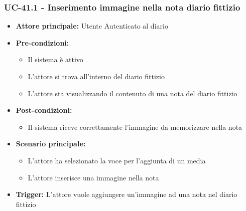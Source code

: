 \documentclass[a4paper,12pt]{article}
\begin{document}
\subsubsection{UC-41.1 - Inserimento immagine nella nota diario fittizio} \label{subsec:UC-41.1}
\begin{itemize}
    \item \textbf{Attore principale:} Utente Autenticato al diario
    \item \textbf{Pre-condizioni:}
    \begin{itemize}
        \item Il sistema è attivo
        \item L'attore si trova all'interno del diario fittizio
        \item L'attore sta visualizzando il contenuto di una nota del diario fittizio
    \end{itemize}
    \item \textbf{Post-condizioni:}
    \begin{itemize}
        \item Il sistema riceve correttamente l'immagine da memorizzare nella nota
    \end{itemize}
    \item \textbf{Scenario principale:}
    \begin{itemize}
        \item L'attore ha selezionato la voce per l'aggiunta di un media
        \item L'attore inserisce una immagine nella nota
    \end{itemize}
    \item \textbf{Trigger:} L'attore vuole aggiungere un'immagine ad una nota nel diario fittizio
\end{itemize}
\end{document}
